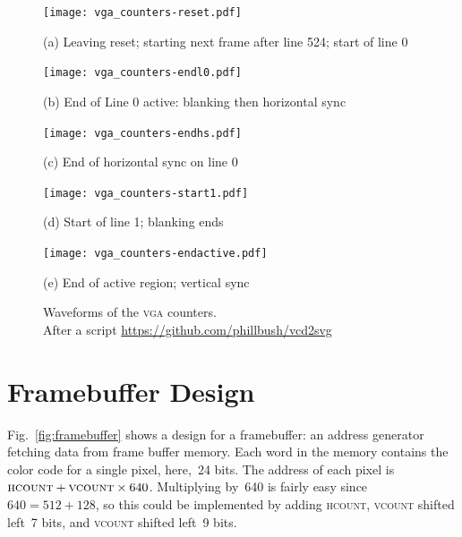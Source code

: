\documentclass[11pt]{article}
\newcommand{\figref}[1]{Fig.~\ref{fig:#1}}
\begin{document}
\begin{figure}

  \centering
  
  \texttt{[image: vga\_counters-reset.pdf]}

  (a) Leaving reset; starting next frame after line 524; start of line 0

  \itempad
 
  \texttt{[image: vga\_counters-endl0.pdf]}

  (b) End of Line 0 active: blanking then horizontal sync

  \itempad
  
  \texttt{[image: vga\_counters-endhs.pdf]}

  (c) End of horizontal sync on line 0

  \itempad
  
  \texttt{[image: vga\_counters-start1.pdf]}

  (d) Start of line 1; blanking ends
  
  \itempad

  \texttt{[image: vga\_counters-endactive.pdf]}

  (e) End of active region; vertical sync

  \caption{Waveforms of the \textsc{vga} counters.\\ After a script \url{https://github.com/phillbush/vcd2svg} }
  \label{fig:vga-waveforms}

\end{figure}

\clearpage

\section{Framebuffer Design}

\figref{framebuffer} shows a design for a framebuffer: an address
generator fetching data from frame buffer memory.  Each word in the
memory contains the color code for a single pixel, here,~24 bits.  The
address of each pixel is $\textsc{hcount} + \textsc{vcount} \times
640$.  Multiplying by~640 is fairly easy since $640 = 512 + 128$, so
this could be implemented by adding \textsc{hcount}, \textsc{vcount}
shifted left~7 bits, and \textsc{vcount} shifted left~9 bits.
\end{document}
